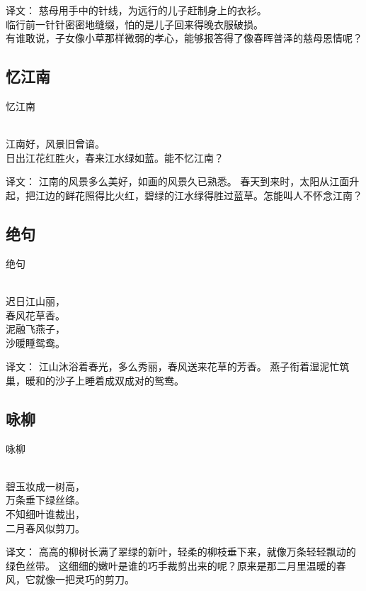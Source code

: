 译文：
慈母用手中的针线，为远行的儿子赶制身上的衣衫。\\
临行前一针针密密地缝缀，怕的是儿子回来得晚衣服破损。\\
有谁敢说，子女像小草那样微弱的孝心，能够报答得了像春晖普泽的慈母恩情呢？

\subsection{忆江南}

\noindent 忆江南

  \\

\noindent 江南好，风景旧曾谙。\\
日出江花红胜火，春来江水绿如蓝。能不忆江南？

译文：
江南的风景多么美好，如画的风景久已熟悉。
春天到来时，太阳从江面升起，把江边的鲜花照得比火红，碧绿的江水绿得胜过蓝草。怎能叫人不怀念江南？

\subsection{绝句}

\noindent 绝句

  \\

\noindent 迟日江山丽，\\春风花草香。\\
泥融飞燕子，\\沙暖睡鸳鸯。

译文：
江山沐浴着春光，多么秀丽，春风送来花草的芳香。
燕子衔着湿泥忙筑巢，暖和的沙子上睡着成双成对的鸳鸯。

\subsection{咏柳}

\noindent 咏柳

  \\

\noindent 碧玉妆成一树高，\\万条垂下绿丝绦。\\
不知细叶谁裁出，\\二月春风似剪刀。

译文：
高高的柳树长满了翠绿的新叶，轻柔的柳枝垂下来，就像万条轻轻飘动的绿色丝带。
这细细的嫩叶是谁的巧手裁剪出来的呢？原来是那二月里温暖的春风，它就像一把灵巧的剪刀。